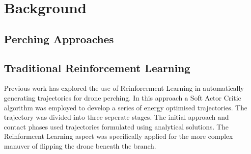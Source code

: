 \chapter{Background}



\section{Perching Approaches}

\section{Traditional Reinforcement Learning}

Previous work has explored the use of Reinforcement Learning in automatically generating trajectories for drone perching\cite{learnedTetheredPerchingFabian}.
In this approach a Soft Actor Critic algorithm was employed to develop a series of energy optimised trajectories.
The trajectory was divided into three seperate stages.
The initial approach and contact phases used trajectories formulated using analytical solutions.
The Reinformcent Learning aspect was specifically applied for the more complex manuver of flipping the drone beneath the branch.

